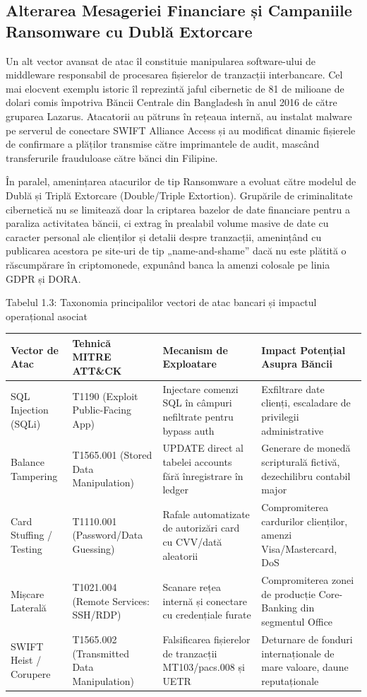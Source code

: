 \subsection{Alterarea Mesageriei Financiare și Campaniile Ransomware cu Dublă Extorcare}

Un alt vector avansat de atac îl constituie manipularea software-ului de middleware responsabil de procesarea fișierelor de tranzacții interbancare. Cel mai elocvent exemplu istoric îl reprezintă jaful cibernetic de 81 de milioane de dolari comis împotriva Băncii Centrale din Bangladesh în anul 2016 de către gruparea Lazarus. Atacatorii au pătruns în rețeaua internă, au instalat malware pe serverul de conectare SWIFT Alliance Access și au modificat dinamic fișierele de confirmare a plăților transmise către imprimantele de audit, mascând transferurile frauduloase către bănci din Filipine.

În paralel, amenințarea atacurilor de tip Ransomware a evoluat către modelul de Dublă și Triplă Extorcare (Double/Triple Extortion). Grupările de criminalitate cibernetică nu se limitează doar la criptarea bazelor de date financiare pentru a paraliza activitatea băncii, ci extrag în prealabil volume masive de date cu caracter personal ale clienților și detalii despre tranzacții, amenințând cu publicarea acestora pe site-uri de tip „name-and-shame” dacă nu este plătită o răscumpărare în criptomonede, expunând banca la amenzi colosale pe linia GDPR și DORA.

Tabelul 1.3: Taxonomia principalilor vectori de atac bancari și impactul operațional asociat

\begin{table}[htbp]
\centering
\small
\begin{tabular}{p{} p{} p{} p{}}
\toprule
Vector de Atac & Tehnică MITRE ATT\&CK & Mecanism de Exploatare & Impact Potențial Asupra Băncii \\
\midrule
SQL Injection (SQLi) & T1190 (Exploit Public-Facing App) & Injectare comenzi SQL în câmpuri nefiltrate pentru bypass auth & Exfiltrare date clienți, escaladare de privilegii administrative \\
Balance Tampering & T1565.001 (Stored Data Manipulation) & UPDATE direct al tabelei accounts fără înregistrare în ledger & Generare de monedă scripturală fictivă, dezechilibru contabil major \\
Card Stuffing / Testing & T1110.001 (Password/Data Guessing) & Rafale automatizate de autorizări card cu CVV/dată aleatorii & Compromiterea cardurilor clienților, amenzi Visa/Mastercard, DoS \\
Mișcare Laterală & T1021.004 (Remote Services: SSH/RDP) & Scanare rețea internă și conectare cu credențiale furate & Compromiterea zonei de producție Core-Banking din segmentul Office \\
SWIFT Heist / Corupere & T1565.002 (Transmitted Data Manipulation) & Falsificarea fișierelor de tranzacții MT103/pacs.008 și UETR & Deturnare de fonduri internaționale de mare valoare, daune reputaționale \\
\bottomrule
\end{tabular}
\end{table}


